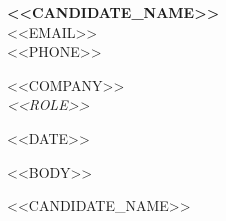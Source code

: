 \documentclass[11pt,a4paper]{article}
\begin{document}
\begin{flushleft}
\textbf{<<CANDIDATE_NAME>>} \\
<<EMAIL>> \\
<<PHONE>>
\end{flushleft}

\vspace{1em}

\begin{flushleft}
<<COMPANY>> \\
\textit{<<ROLE>>}
\end{flushleft}

\vspace{0.5em}

\begin{flushright}
<<DATE>>
\end{flushright}

\vspace{1em}

<<BODY>>

\vspace{1.5em}

<<CANDIDATE_NAME>>
\end{document}
